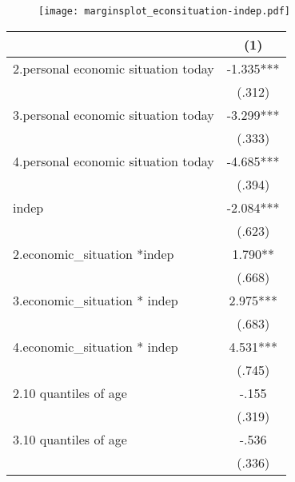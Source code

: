 \documentclass[12pt]{article}
\begin{document}
\begin{enumerate}
\begin{figure}[H]%
	\begin{center} %
	\texttt{[image: marginsplot\_econsituation-indep.pdf]}
	\end{center} 
	\end{figure}
	
\begin{table} \centering \footnotesize
\def\sym#1{\ifmmode^{#1}\else\(^{#1}\)\fi}
\begin{tabular}{l*{1}{c}}
\hline\hline
                                                  &\multicolumn{1}{c}{(1)}\\
\hline
2.personal economic situation today               &      -1.335***\\
                                                  &      (.312)   \\
3.personal economic situation today               &      -3.299***\\
                                                  &      (.333)   \\
4.personal economic situation today               &      -4.685***\\
                                                  &      (.394)   \\
indep                                           &      -2.084***\\
                                                  &      (.623)   \\
2.economic\_situation *indep                      &       1.790** \\
                                                  &      (.668)   \\
3.economic\_situation * indep                      &       2.975***\\
                                                  &      (.683)   \\
4.economic\_situation * indep                      &       4.531***\\
                                                  &      (.745)   \\
2.10 quantiles of age                             &       -.155   \\
                                                  &      (.319)   \\
3.10 quantiles of age                             &       -.536   \\
                                                  &      (.336)   \\

\end{tabular}
\end{table}
\end{enumerate}
\end{document}
